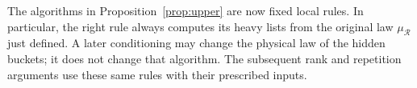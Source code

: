 The algorithms in Proposition~\ref{prop:upper} are now fixed local rules.
In particular, the right rule always computes its heavy lists from the
original law $\mu_{\mathcal R}$ just defined.  A later conditioning may
change the physical law of the hidden buckets; it does not change that
algorithm.  The subsequent rank and repetition arguments use these same
rules with their prescribed inputs.
